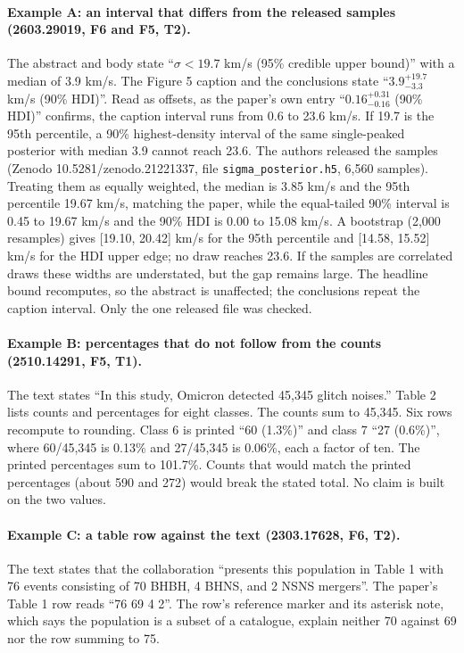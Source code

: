 \documentclass[reprint,amsmath,amssymb,aps,superscriptaddress,nofootinbib]{revtex4-2}
\begin{document}
\paragraph*{Example A: an interval that differs from the released samples (2603.29019, F6 and F5, T2).} The abstract and body state ``$\sigma < 19.7$ km/s (95\% credible upper bound)'' with a median of 3.9 km/s. The Figure 5 caption and the conclusions state ``$3.9^{+19.7}_{-3.3}$ km/s (90\% HDI)''. Read as offsets, as the paper's own entry ``$0.16^{+0.31}_{-0.16}$ (90\% HDI)'' confirms, the caption interval runs from 0.6 to 23.6 km/s. If 19.7 is the 95th percentile, a 90\% highest-density interval of the same single-peaked posterior with median 3.9 cannot reach 23.6. The authors released the samples (Zenodo 10.5281/zenodo.21221337, file \texttt{sigma\_posterior.h5}, 6,560 samples). Treating them as equally weighted, the median is 3.85 km/s and the 95th percentile 19.67 km/s, matching the paper, while the equal-tailed 90\% interval is 0.45 to 19.67 km/s and the 90\% HDI is 0.00 to 15.08 km/s. A bootstrap (2,000 resamples) gives [19.10, 20.42] km/s for the 95th percentile and [14.58, 15.52] km/s for the HDI upper edge; no draw reaches 23.6. If the samples are correlated draws these widths are understated, but the gap remains large. The headline bound recomputes, so the abstract is unaffected; the conclusions repeat the caption interval. Only the one released file was checked.

\paragraph*{Example B: percentages that do not follow from the counts (2510.14291, F5, T1).} The text states ``In this study, Omicron detected 45,345 glitch noises.'' Table 2 lists counts and percentages for eight classes. The counts sum to 45,345. Six rows recompute to rounding. Class 6 is printed ``60 (1.3\%)'' and class 7 ``27 (0.6\%)'', where 60/45,345 is 0.13\% and 27/45,345 is 0.06\%, each a factor of ten. The printed percentages sum to 101.7\%. Counts that would match the printed percentages (about 590 and 272) would break the stated total. No claim is built on the two values.

\paragraph*{Example C: a table row against the text (2303.17628, F6, T2).} The text states that the collaboration ``presents this population in Table 1 with 76 events consisting of 70 BHBH, 4 BHNS, and 2 NSNS mergers''. The paper's Table 1 row reads ``76 69 4 2''. The row's reference marker and its asterisk note, which says the population is a subset of a catalogue, explain neither 70 against 69 nor the row summing to 75.
\end{document}
